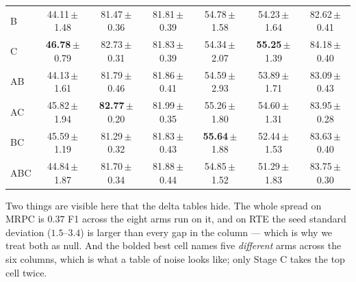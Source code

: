 \documentclass{article}
\begin{document}
\begin{table}[h]
\begin{center}
\begin{tabular}{lcccccc}
B   & 44.11\,$\pm$1.48 & 81.47\,$\pm$0.36 & 81.81\,$\pm$0.39 & 54.78\,$\pm$1.58 & 54.23\,$\pm$1.64 & 82.62\,$\pm$0.41 \\
C   & \textbf{46.78}\,$\pm$0.79 & 82.73\,$\pm$0.31 & 81.83\,$\pm$0.39 & 54.34\,$\pm$2.07 & \textbf{55.25}\,$\pm$1.39 & 84.18\,$\pm$0.40 \\
AB  & 44.13\,$\pm$1.61 & 81.79\,$\pm$0.46 & 81.86\,$\pm$0.41 & 54.59\,$\pm$2.93 & 53.89\,$\pm$1.71 & 83.09\,$\pm$0.43 \\
AC  & 45.82\,$\pm$1.94 & \textbf{82.77}\,$\pm$0.20 & 81.99\,$\pm$0.35 & 55.26\,$\pm$1.80 & 54.60\,$\pm$1.31 & 83.95\,$\pm$0.28 \\
BC  & 45.59\,$\pm$1.19 & 81.29\,$\pm$0.32 & 81.83\,$\pm$0.43 & \textbf{55.64}\,$\pm$1.88 & 52.44\,$\pm$1.53 & 83.63\,$\pm$0.40 \\
ABC & 44.84\,$\pm$1.87 & 81.70\,$\pm$0.34 & 81.88\,$\pm$0.44 & 54.85\,$\pm$1.52 & 51.29\,$\pm$1.83 & 83.75\,$\pm$0.30 \\
\bottomrule
\end{tabular}
\end{center}
\end{table}

Two things are visible here that the delta tables hide. The whole spread on MRPC
is $0.37$ F1 across the eight arms run on it, and on RTE the seed standard
deviation ($1.5$--$3.4$) is larger than every gap in the column --- which is why
we treat both as null. And the bolded best cell names five \emph{different}
arms across the six columns, which is what a table of noise looks like; only
Stage C takes the top cell twice.
\end{document}
